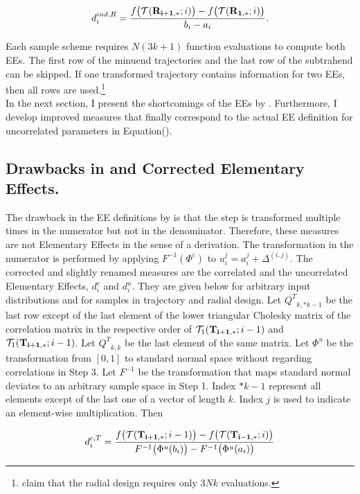 \documentclass[a4paper,12pt]{article}
\begin{document}
\begin{align}
d_i^{ind, R} = \frac{f\big(\mathcal{T}(\bold{R_{i+1,*}}; i)\big) - f\big(\mathcal{T}(\bold{R_{1,*}}; i)\big)}{b_i - a_i}.
\end{align}

\noindent
Each sample scheme requires $N(3k+1)$ function evaluations to compute both EEs. The first row of the minuend trajectories and the last row of the subtrahend can be skipped. If one transformed trajectory contains information for two EEs, then all rows are used.\footnote{\cite{ge2017extending} claim that the radial design requires only $3Nk$ evaluations.}\\

\noindent
In the next section, I present the shortcomings of the EEs by \cite{ge2017extending}. 
Furthermore, I develop improved measures that finally correspond to the actual EE definition for uncorrelated parameters in Equation(\label{eq:EE}).


\subsection{Drawbacks in \cite{ge2017extending} and Corrected Elementary Effects.}

The drawback in the EE definitions by \cite{ge2017extending} is that the step is transformed multiple times in the numerator but not in the denominator. Therefore, these measures are not Elementary Effects in the sense of a derivation. The transformation in the numerator is performed by applying $F^{-1}(\Phi^c)$ to $u_i^j = a_i^j + \Delta^{(i,j)}$. The corrected and slightly renamed measures are the correlated and the uncorrelated Elementary Effects, $d_i^{c}$ and $d_i^{u}$. They are given below for arbitrary input distributions and for samples in trajectory and radial design. Let ${Q^T}_{k,*k-1}$ be the last row except of the last element of the lower triangular Cholesky matrix of the correlation matrix in the respective order of $\mathcal{T}_1(\bold{T_{i+1,*}}; i-1)$ and $\mathcal{T}_1(\bold{T_{i+1,*}}; i-1)$. Let ${Q^T}_{k,k}$ be the last element of the same matrix. Let $\Phi^u$ be the transformation from $[0,1]$ to standard normal space without regarding correlations in Step 3. Let $F^{-1}$ be the transformation that maps standard normal deviates to an arbitrary sample space in Step 1. Index $*k-1$ represent all elements except of the last one of a vector of length $k$. Index $j$ is used to indicate an element-wise multiplication. Then

\begin{align}
d_i^{c,T} = \frac{f\big(\mathcal{T}(\bold{T_{i+1,*}}; i-1)\big) - f\big(\mathcal{T}(\bold{T_{i-1,*}}; i)\big)}{F^{-1}\big(\Phi^u(b_i)\big) - F^{-1}\big( \Phi^u(a_i)\big)}
\end{align}
\end{document}
